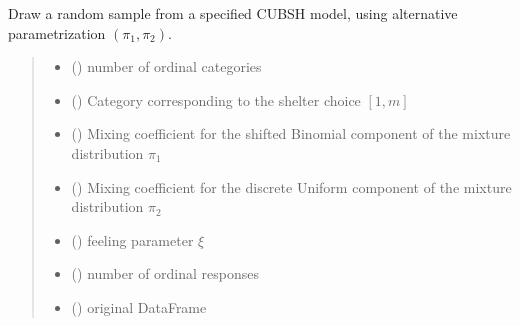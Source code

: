 \documentclass[letterpaper,10pt,english]{sphinxmanual}
\begin{document}
\begin{fulllineitems}
\label{\detokenize{cubmods:cubmods.cubsh.draw2}}
\pysigstartsignatures
{}
\pysigstopsignatures
\sphinxAtStartPar
Draw a random sample from a specified CUBSH model,
using alternative parametrization \((\pi_1, \pi_2)\).
\begin{quote}\begin{description}
\begin{itemize}
\item {} 
\sphinxAtStartPar
{} () \textendash{} number of ordinal categories

\item {} 
\sphinxAtStartPar
{} () \textendash{} Category corresponding to the shelter choice \([1,m]\)

\item {} 
\sphinxAtStartPar
{} () \textendash{} Mixing coefficient for the shifted Binomial component of the mixture distribution \(\pi_1\)

\item {} 
\sphinxAtStartPar
{} () \textendash{} Mixing coefficient for the discrete Uniform component of the mixture distribution \(\pi_2\)

\item {} 
\sphinxAtStartPar
{} () \textendash{} feeling parameter \(\xi\)

\item {} 
\sphinxAtStartPar
{} () \textendash{} number of ordinal responses

\item {} 
\sphinxAtStartPar
{} () \textendash{} original DataFrame


\end{itemize}
\end{description}
\end{quote}
\end{fulllineitems}
\end{document}
